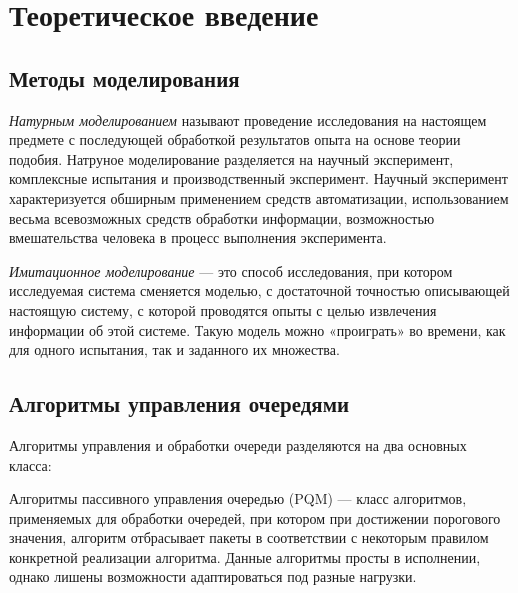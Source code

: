 
\chapter{Теоретическое введение}
\label{chap1}

\section{Методы моделирования}
\label{chap1:sec1}


\emph{Натурным моделированием} называют проведение исследования на настоящем
предмете с последующей обработкой результатов опыта на основе теории
подобия. Натруное моделирование разделяется на научный эксперимент,
комплексные испытания и производственный эксперимент. Научный
эксперимент характеризуется обширным применением средств
автоматизации, использованием весьма всевозможных средств обработки
информации, возможностью вмешательства человека в процесс выполнения
эксперимента.


\emph{Имитационное моделирование} --- это способ исследования, при котором
исследуемая система сменяется моделью, с достаточной точностью
описывающей настоящую систему, с которой проводятся опыты с целью
извлечения информации об этой системе. Такую модель можно «проиграть»
во времени, как для одного испытания, так и заданного их множества.



\section{Алгоритмы управления очередями}
\label{chap1:sec2}

Алгоритмы управления и обработки очереди разделяются на два основных класса:

Алгоритмы пассивного управления очередью (PQM) --- класс алгоритмов, применяемых для обработки очередей, при котором при достижении порогового значения, алгоритм отбрасывает пакеты в соответствии с некоторым правилом конкретной реализации алгоритма. Данные алгоритмы просты в исполнении, однако лишены возможности адаптироваться под разные нагрузки. 

